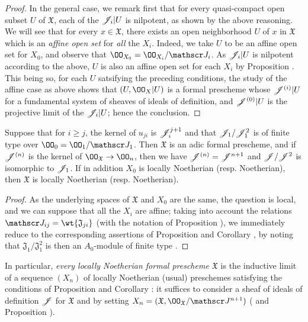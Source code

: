 \begin{proof}
In the general case, we remark first that for every quasi-compact open subset $U$ of $\mathfrak{X}$, each of the $\mathscr{J}_i|U$ is nilpotent, as shown by the above reasoning.
We will see that for every $x\in\mathfrak{X}$, there exists an open neighborhood $U$ of $x$ in $\mathfrak{X}$ which is an \emph{affine open set} for \emph{all} the $X_i$.
Indeed, we take $U$ to be an affine open set for $X_0$, and observe that $\OO_{X_0}=\OO_{X_i}/\sh{J}_i$.
As $\mathscr{J}_i|U$ is nilpotent according to the above, $U$ is also an affine open set for each $X_i$ by Proposition .
This being so, for each $U$ satsifying the preceding conditions, the study of the affine case as above shows that $(U,\OO_X|U)$ is a formal prescheme whose $\mathscr{J}^{(i)}|U$ for a fundamental system of sheaves of ideals of definition, and $\mathscr{J}^{(0)}|U$ is the projective limit of the $\mathscr{J}_i|U$; hence the conclusion.
\end{proof}

\begin{cor}[10.6.4]
\label{1.10.6.4}
Suppose that for $i\geq j$, the kernel of $u_{ji}$ is $\mathscr{J}_i^{j+1}$ and that $\mathscr{J}_1/\mathscr{J}_1^2$
is of finite type over $\OO_0=\OO_1/\sh{J}_1$.
Then $\mathfrak{X}$ is an adic formal prescheme, and if $\mathscr{J}^{(n)}$ is the kernel of $\OO_\mathfrak{X}\to\OO_n$, then we have $\mathscr{J}^{(n)}=\mathscr{J}^{n+1}$ and $\mathscr{J}/\mathscr{J}^2$ is isomorphic to $\mathscr{J}_1$.
If in addition $X_0$ is locally Noetherian (resp. Noetherian), then $\mathfrak{X}$ is locally Noetherian (resp. Noetherian).
\end{cor}

\begin{proof}
\label{proof-1.10.6.4}
As the underlying spaces of $\mathfrak{X}$ and $X_0$ are the same, the question is local, and we can suppose that all the $X_i$ are affine; taking into account the relations $\sh{J}_{ij}=\wt{\mathfrak{J}_{ji}}$ (with the notation of Proposition ), we immediately reduce to the corresponding assertions of Proposition  and Corollary , by noting that $\mathfrak{J}_1/\mathfrak{J}_1^2$ is then an $A_0$-module of finite type .
\end{proof}

In particular, \emph{every locally Noetherian formal prescheme $\mathfrak{X}$} is the inductive limit of a sequence $(X_n)$ of locally Noetherian (usual) preschemes satisfying the conditions of Proposition  and Corollary : it suffices to consider a sheaf of ideals of definition $\mathscr{J}$ for $\mathfrak{X}$  and by setting $X_n=(\mathfrak{X},\OO_\mathfrak{X}/\sh{J}^{n+1})$ ( and Proposition ).

